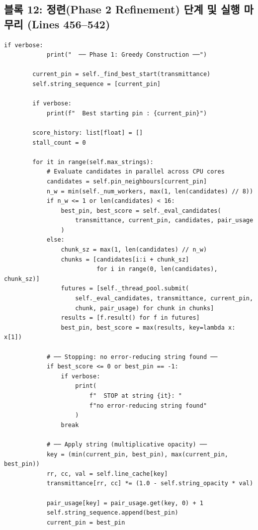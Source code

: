 \subsection*{블록 12: 정련(Phase 2 Refinement) 단계 및 실행 마무리 (Lines 456--542)}
\begin{lstlisting}[firstnumber=456]
        if verbose:
            print("  ── Phase 1: Greedy Construction ──")

        current_pin = self._find_best_start(transmittance)
        self.string_sequence = [current_pin]

        if verbose:
            print(f"  Best starting pin : {current_pin}")

        score_history: list[float] = []
        stall_count = 0

        for it in range(self.max_strings):
            # Evaluate candidates in parallel across CPU cores
            candidates = self.pin_neighbours[current_pin]
            n_w = min(self._num_workers, max(1, len(candidates) // 8))
            if n_w <= 1 or len(candidates) < 16:
                best_pin, best_score = self._eval_candidates(
                    transmittance, current_pin, candidates, pair_usage
                )
            else:
                chunk_sz = max(1, len(candidates) // n_w)
                chunks = [candidates[i:i + chunk_sz]
                          for i in range(0, len(candidates), chunk_sz)]
                futures = [self._thread_pool.submit(
                    self._eval_candidates, transmittance, current_pin,
                    chunk, pair_usage) for chunk in chunks]
                results = [f.result() for f in futures]
                best_pin, best_score = max(results, key=lambda x: x[1])

            # ── Stopping: no error-reducing string found ──
            if best_score <= 0 or best_pin == -1:
                if verbose:
                    print(
                        f"  STOP at string {it}: "
                        f"no error-reducing string found"
                    )
                break

            # ── Apply string (multiplicative opacity) ──
            key = (min(current_pin, best_pin), max(current_pin, best_pin))
            rr, cc, val = self.line_cache[key]
            transmittance[rr, cc] *= (1.0 - self.string_opacity * val)

            pair_usage[key] = pair_usage.get(key, 0) + 1
            self.string_sequence.append(best_pin)
            current_pin = best_pin


\end{lstlisting}
